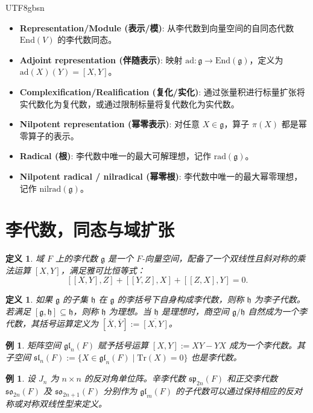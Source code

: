 \documentclass[11pt]{article}
\newtheorem{definition}[theorem]{定义}
\newtheorem{example}[theorem]{例}
\begin{document}
\begin{CJK*}{UTF8}{gbsn}
\begin{itemize}
    \item \textbf{Representation/Module (表示/模)}: 从李代数到向量空间的自同态代数 $\mathrm{End}(V)$ 的李代数同态。
    \item \textbf{Adjoint representation (伴随表示)}: 映射 $\mathrm{ad}: \mathfrak{g} \to \mathrm{End}(\mathfrak{g})$，定义为 $\mathrm{ad}(X)(Y) = [X, Y]$。
    \item \textbf{Complexification/Realification (复化/实化)}: 通过张量积进行标量扩张将实代数化为复代数，或通过限制标量将复代数化为实代数。
    \item \textbf{Nilpotent representation (幂零表示)}: 对任意 $X \in \mathfrak{g}$，算子 $\pi(X)$ 都是幂零算子的表示。
    \item \textbf{Radical (根)}: 李代数中唯一的最大可解理想，记作 $\mathrm{rad}(\mathfrak{g})$。
    \item \textbf{Nilpotent radical / nilradical (幂零根)}: 李代数中唯一的最大幂零理想，记作 $\mathrm{nilrad}(\mathfrak{g})$。
\end{itemize}

\section{李代数，同态与域扩张}

\begin{definition}
域 $F$ 上的李代数 $\mathfrak{g}$ 是一个 $F$-向量空间，配备了一个双线性且斜对称的乘法运算 $[X, Y]$，满足雅可比恒等式：
$$[[X, Y], Z] + [[Y, Z], X] + [[Z, X], Y] = 0.$$
\end{definition}

\begin{definition}
如果 $\mathfrak{g}$ 的子集 $\mathfrak{h}$ 在 $\mathfrak{g}$ 的李括号下自身构成李代数，则称 $\mathfrak{h}$ 为李子代数。若满足 $[\mathfrak{g}, \mathfrak{h}] \subseteq \mathfrak{h}$，则称 $\mathfrak{h}$ 为理想。当 $\mathfrak{h}$ 是理想时，商空间 $\mathfrak{g}/\mathfrak{h}$ 自然成为一个李代数，其括号运算定义为 $[\overline{X}, \overline{Y}] := \overline{[X, Y]}$。
\end{definition}

\begin{example}
矩阵空间 $\mathfrak{gl}_n(F)$ 赋予括号运算 $[X, Y] := XY - YX$ 成为一个李代数。其子空间 $\mathfrak{sl}_n(F) := \{X \in \mathfrak{gl}_n(F) \mid \mathrm{Tr}(X) = 0\}$ 也是李代数。
\end{example}

\begin{example}
设 $J_n$ 为 $n \times n$ 的反对角单位阵。辛李代数 $\mathfrak{sp}_{2n}(F)$ 和正交李代数 $\mathfrak{so}_{2n}(F)$ 及 $\mathfrak{so}_{2n+1}(F)$ 分别作为 $\mathfrak{gl}_m(F)$ 的子代数可以通过保持相应的反对称或对称双线性型来定义。
\end{example}


\end{CJK*}
\end{document}
